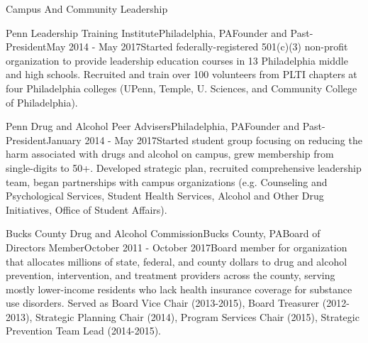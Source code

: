 \documentclass{resume} %
\begin{document}
\begin{rSection}{Campus And Community Leadership}
\begin{rSubsection}{Penn Leadership Training Institute}{Philadelphia, PA}{Founder and Past-President}{May 2014 - May 2017}Started federally-registered 501(c)(3) non-profit organization to provide leadership education courses in 13 Philadelphia middle and high schools. Recruited and train over 100 volunteers from PLTI chapters at four Philadelphia colleges (UPenn, Temple, U. Sciences, and Community College of Philadelphia).
\end{rSubsection}
\begin{rSubsection}{Penn Drug and Alcohol Peer Advisers}{Philadelphia, PA}{Founder and Past-President}{January 2014 - May 2017}Started student group focusing on reducing the harm associated with drugs and alcohol on campus, grew membership from single-digits to 50+. Developed strategic plan, recruited comprehensive leadership team, began partnerships with campus organizations (e.g. Counseling and Psychological Services, Student Health Services, Alcohol and Other Drug Initiatives, Office of Student Affairs).
\end{rSubsection}
\begin{rSubsection}{Bucks County Drug and Alcohol Commission}{Bucks County, PA}{Board of Directors Member}{October 2011 - October 2017}Board member for organization that allocates millions of state, federal, and county dollars to drug and alcohol prevention, intervention, and treatment providers across the county, serving mostly lower-income residents who lack health insurance coverage for substance use disorders. Served as Board Vice Chair (2013-2015), Board Treasurer (2012-2013), Strategic Planning Chair (2014), Program Services Chair (2015), Strategic Prevention Team Lead (2014-2015).
\end{rSubsection}
\end{rSection}
\end{document}
